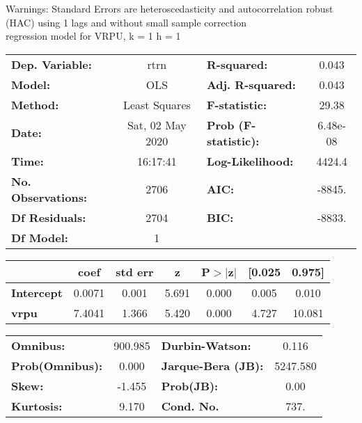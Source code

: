 Warnings: \newline
 [1] Standard Errors are heteroscedasticity and autocorrelation robust (HAC) using 1 lags and without small sample correction\\ 

regression model for VRPU, k = 1 h = 1\begin{center}
\begin{tabular}{lclc}
\toprule
\textbf{Dep. Variable:}    &       rtrn       & \textbf{  R-squared:         } &     0.043   \\
\textbf{Model:}            &       OLS        & \textbf{  Adj. R-squared:    } &     0.043   \\
\textbf{Method:}           &  Least Squares   & \textbf{  F-statistic:       } &     29.38   \\
\textbf{Date:}             & Sat, 02 May 2020 & \textbf{  Prob (F-statistic):} &  6.48e-08   \\
\textbf{Time:}             &     16:17:41     & \textbf{  Log-Likelihood:    } &    4424.4   \\
\textbf{No. Observations:} &        2706      & \textbf{  AIC:               } &    -8845.   \\
\textbf{Df Residuals:}     &        2704      & \textbf{  BIC:               } &    -8833.   \\
\textbf{Df Model:}         &           1      & \textbf{                     } &             \\
\bottomrule
\end{tabular}
\begin{tabular}{lcccccc}
                   & \textbf{coef} & \textbf{std err} & \textbf{z} & \textbf{P$> |$z$|$} & \textbf{[0.025} & \textbf{0.975]}  \\
\midrule
\textbf{Intercept} &       0.0071  &        0.001     &     5.691  &         0.000        &        0.005    &        0.010     \\
\textbf{vrpu}      &       7.4041  &        1.366     &     5.420  &         0.000        &        4.727    &       10.081     \\
\bottomrule
\end{tabular}
\begin{tabular}{lclc}
\textbf{Omnibus:}       & 900.985 & \textbf{  Durbin-Watson:     } &    0.116  \\
\textbf{Prob(Omnibus):} &   0.000 & \textbf{  Jarque-Bera (JB):  } & 5247.580  \\
\textbf{Skew:}          &  -1.455 & \textbf{  Prob(JB):          } &     0.00  \\
\textbf{Kurtosis:}      &   9.170 & \textbf{  Cond. No.          } &     737.  \\
\bottomrule
\end{tabular}
\end{center}

